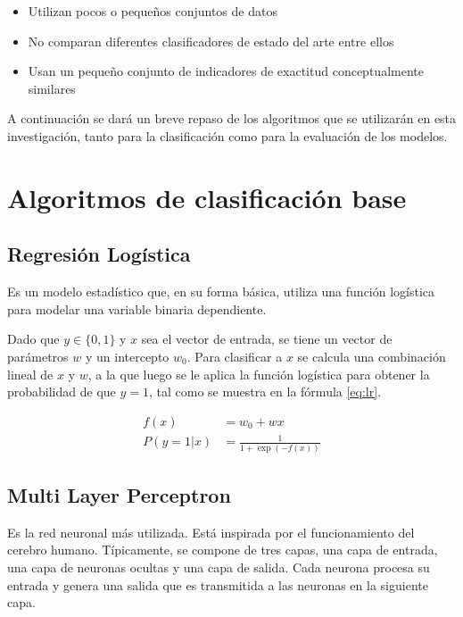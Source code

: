 \begin{itemize}
    \item Utilizan pocos o pequeños conjuntos de datos
    \item No comparan diferentes clasificadores de estado del arte entre ellos
    \item Usan un pequeño conjunto de indicadores de exactitud conceptualmente similares
\end{itemize}

A continuación se dará un breve repaso de los algoritmos que se utilizarán en esta investigación, tanto para la clasificación como para la evaluación de los modelos.

\section{Algoritmos de clasificación base}

\subsection{Regresión Logística}

Es un modelo estadístico que, en su forma básica, utiliza una función logística para modelar una variable binaria dependiente.

Dado que $y\in \{0, 1\}$ y $x$ sea el vector de entrada, se tiene un vector de parámetros $w$ y un intercepto $w_0$. Para clasificar a $x$ se calcula una combinación lineal de $x$ y $w$, a la que luego se le aplica la función logística para obtener la probabilidad de que $y = 1$, tal como se muestra en la fórmula \ref{eq:lr}.

\begin{equation}
    \label{eq:lr}
\begin{split}
    f(x) &= w_0 + wx \\
    P(y=1|x) &= \frac{1}{1 + \exp(-f(x)) }
\end{split}
\end{equation}

\subsection{Multi Layer Perceptron}

Es la red neuronal más utilizada. Está inspirada por el funcionamiento del cerebro humano. Típicamente, se compone de tres capas, una capa de entrada, una capa de neuronas ocultas y una capa de salida. Cada neurona procesa su entrada y genera una salida que es transmitida a las neuronas en la siguiente capa.

